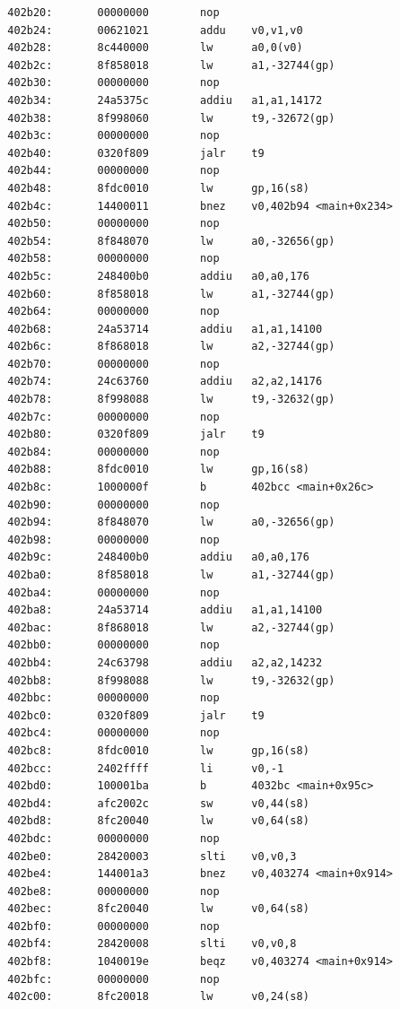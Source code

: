 \documentclass[11pt]{article}
\begin{document}
\begin{verbatim}
  402b20:       00000000        nop
  402b24:       00621021        addu    v0,v1,v0
  402b28:       8c440000        lw      a0,0(v0)
  402b2c:       8f858018        lw      a1,-32744(gp)
  402b30:       00000000        nop
  402b34:       24a5375c        addiu   a1,a1,14172
  402b38:       8f998060        lw      t9,-32672(gp)
  402b3c:       00000000        nop
  402b40:       0320f809        jalr    t9
  402b44:       00000000        nop
  402b48:       8fdc0010        lw      gp,16(s8)
  402b4c:       14400011        bnez    v0,402b94 <main+0x234>
  402b50:       00000000        nop
  402b54:       8f848070        lw      a0,-32656(gp)
  402b58:       00000000        nop
  402b5c:       248400b0        addiu   a0,a0,176
  402b60:       8f858018        lw      a1,-32744(gp)
  402b64:       00000000        nop
  402b68:       24a53714        addiu   a1,a1,14100
  402b6c:       8f868018        lw      a2,-32744(gp)
  402b70:       00000000        nop
  402b74:       24c63760        addiu   a2,a2,14176
  402b78:       8f998088        lw      t9,-32632(gp)
  402b7c:       00000000        nop
  402b80:       0320f809        jalr    t9
  402b84:       00000000        nop
  402b88:       8fdc0010        lw      gp,16(s8)
  402b8c:       1000000f        b       402bcc <main+0x26c>
  402b90:       00000000        nop
  402b94:       8f848070        lw      a0,-32656(gp)
  402b98:       00000000        nop
  402b9c:       248400b0        addiu   a0,a0,176
  402ba0:       8f858018        lw      a1,-32744(gp)
  402ba4:       00000000        nop
  402ba8:       24a53714        addiu   a1,a1,14100
  402bac:       8f868018        lw      a2,-32744(gp)
  402bb0:       00000000        nop
  402bb4:       24c63798        addiu   a2,a2,14232
  402bb8:       8f998088        lw      t9,-32632(gp)
  402bbc:       00000000        nop
  402bc0:       0320f809        jalr    t9
  402bc4:       00000000        nop
  402bc8:       8fdc0010        lw      gp,16(s8)
  402bcc:       2402ffff        li      v0,-1
  402bd0:       100001ba        b       4032bc <main+0x95c>
  402bd4:       afc2002c        sw      v0,44(s8)
  402bd8:       8fc20040        lw      v0,64(s8)
  402bdc:       00000000        nop
  402be0:       28420003        slti    v0,v0,3
  402be4:       144001a3        bnez    v0,403274 <main+0x914>
  402be8:       00000000        nop
  402bec:       8fc20040        lw      v0,64(s8)
  402bf0:       00000000        nop
  402bf4:       28420008        slti    v0,v0,8
  402bf8:       1040019e        beqz    v0,403274 <main+0x914>
  402bfc:       00000000        nop
  402c00:       8fc20018        lw      v0,24(s8)

\end{verbatim}
\end{document}
